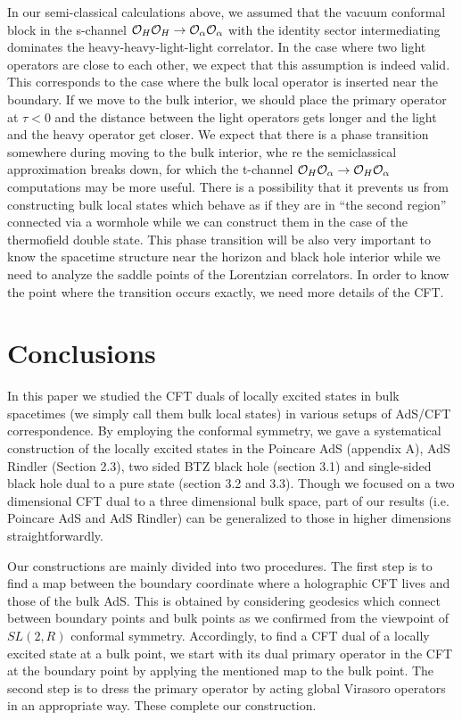 \documentclass[11pt,a4paper]{article}
\def\a{{\alpha}}
\def\CO{{\cal O}}
\def\r{\rightarrow}
\def\r{\rightarrow}
\begin{document}
In our semi-classical calculations above, we assumed that the vacuum conformal block in the s-channel $\CO_H\CO_H\r \CO_\a\CO_\a$ with the identity sector intermediating dominates the heavy-heavy-light-light correlator. In the case where two light operators are close to each other, we expect that this assumption is indeed valid. This corresponds to the case where the bulk local operator is inserted near the boundary. If we move to the bulk interior, we should place the primary operator at $\tau<0$ and the distance between the light operators gets longer and the light and the heavy operator get closer. We expect that there is a phase transition somewhere during moving to the bulk interior, whe
re the semiclassical approximation breaks down, for which the t-channel $\CO_H\CO_\a\r \CO_H\CO_\a$ computations may be more useful. There is a possibility that it prevents us from constructing bulk local states which behave as if  they are  in ``the second region'' connected via a wormhole while we can construct them in the case of the thermofield double state. This phase transition will be also very important to know the spacetime structure near the horizon and black hole interior while we need to analyze the saddle points of the Lorentzian correlators.
In order to know the point where the transition occurs exactly, we need more details of the CFT.


\newpage
\section{Conclusions}

In this paper we studied the CFT duals of locally excited states in bulk spacetimes (we simply call them bulk local states) in various setups of AdS/CFT correspondence. By employing the conformal symmetry, we gave a systematical construction of the locally excited states in the Poincare AdS
(appendix A), AdS Rindler (Section 2.3), two sided BTZ black hole (section 3.1) and 
single-sided black hole dual to a pure state (section 3.2 and 3.3). Though we focused on a two dimensional CFT dual to a three dimensional bulk space, part of our results (i.e. Poincare AdS and AdS Rindler) can be generalized to those in higher dimensions straightforwardly.

Our constructions are mainly divided into two procedures. The first step is to find a map between the boundary coordinate where a holographic CFT lives and those of the bulk AdS. This is obtained by considering geodesics which connect between boundary points and bulk points as we confirmed from the viewpoint of $SL(2,R)$ conformal symmetry. Accordingly, to find a CFT dual of a locally excited state at a bulk point, we start with its dual primary operator in the CFT at the boundary point by applying the mentioned map to the bulk point.  The second step is to dress the primary operator by acting global Virasoro operators in an appropriate way. These complete our construction.
\end{document}
